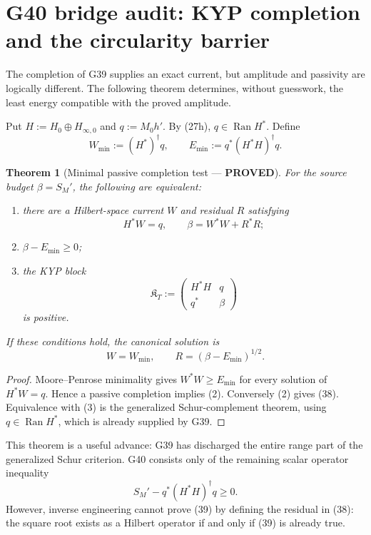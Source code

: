 \documentclass[11pt]{article}
\newtheorem{theorem}{Theorem}
\newcommand{\PROVED}{\textcolor{green!45!black}{\textbf{PROVED}}}
\newcommand{\Ran}{\operatorname{Ran}}
\begin{document}
\section{G40 bridge audit: KYP completion and the circularity barrier}

The completion of G39 supplies an exact current, but amplitude and passivity
are logically different.  The following theorem determines, without guesswork,
the least energy compatible with the proved amplitude.

Put $H:=H_0\oplus H_{\infty,0}$ and
$q:=M_0h'$.  By (27h), $q\in\Ran H^*$.  Define
\begin{equation}
 W_{\min}:=(H^*)^\dagger q,\qquad
 E_{\min}:=q^*(H^*H)^\dagger q.                         \tag{36}
\end{equation}

\begin{theorem}[Minimal passive completion test --- \PROVED]
For the source budget $\beta=S_M'$, the following are equivalent:
\begin{enumerate}
\item there are a Hilbert-space current $W$ and residual $R$ satisfying
\[
 H^*W=q,\qquad \beta=W^*W+R^*R;
\]
\item $\beta-E_{\min}\ge0$;
\item the KYP block
\begin{equation}
 \mathfrak K_T:=
 \begin{pmatrix}H^*H&q\\q^*&\beta\end{pmatrix}          \tag{37}
\end{equation}
is positive.
\end{enumerate}
If these conditions hold, the canonical solution is
\begin{equation}
 W=W_{\min},\qquad R=(\beta-E_{\min})^{1/2}.             \tag{38}
\end{equation}
\end{theorem}

\begin{proof}
Moore--Penrose minimality gives $W^*W\ge E_{\min}$ for every solution of
$H^*W=q$.  Hence a passive completion implies (2).  Conversely (2) gives
(38).  Equivalence with (3) is the generalized Schur-complement theorem,
using $q\in\Ran H^*$, which is already supplied by G39.
\end{proof}

This theorem is a useful advance: G39 has discharged the entire range part of
the generalized Schur criterion.  G40 consists only of the remaining scalar
operator inequality
\begin{equation}
 \boxed{S_M'-q^*(H^*H)^\dagger q\ge0.}                  \tag{39}
\end{equation}
However, inverse engineering cannot prove (39) by defining the residual in
(38): the square root exists as a Hilbert operator if and only if (39) is
already true.
\end{document}

